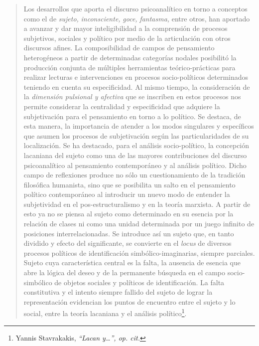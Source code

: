 \begin{quote}
Los desarrollos que aporta el discurso psicoanalítico en torno a conceptos como el de \emph{sujeto,} \emph{inconsciente,} \emph{goce,} \emph{fantasma,} entre otros, han aportado a avanzar y dar mayor inteligibilidad a la comprensión de procesos subjetivos, sociales y político por medio de la articulación con otros discursos afines. La composibilidad de campos de pensamiento heterogéneos a partir de determinadas categorías nodales posibilitó la producción conjunta de múltiples herramientas teórico-prácticas para realizar lecturas e intervenciones en procesos socio-políticos determinados teniendo en cuenta su especificidad. Al mismo tiempo, la consideración de la \emph{dimensión pulsional y afectiva} que se inscriben en estos procesos nos permite considerar la centralidad y especificidad que adquiere la subjetivación para el pensamiento en torno a lo político. Se destaca, de esta manera, la importancia de atender a los modos singulares y específicos que asumen los procesos de subjetivación  según las particularidades de su localización. Se ha destacado, para el análisis socio-político, la concepción lacaniana del sujeto como una de las mayores contribuciones del discurso psicoanalítico al pensamiento contemporáneo y al análisis político. Dicho campo de reflexiones produce no sólo un cuestionamiento de la tradición filosófica humanista, sino que se posibilita un salto en el pensamiento político contemporáneo al introducir un nuevo modo de entender la subjetividad en el pos-estructuralismo y en la teoría marxista. A partir de esto ya no se piensa al sujeto como determinado en su esencia por la relación de clases ni como una unidad determinada por un juego infinito de posiciones interrelacionadas. Se introduce así un sujeto que, en tanto dividido y efecto del significante, se convierte en el \emph{locus} de diversos procesos políticos de identificación simbólico-imaginarias, siempre parciales. Sujeto cuya característica central es la falta, la ausencia de esencia que abre la lógica del deseo y de la permanente búsqueda en el campo socio-simbólico de objetos sociales y políticos de identificación. La falta constitutiva y el intento siempre fallido del sujeto de lograr la representación evidencian los puntos de encuentro entre el sujeto y lo social, entre la teoría lacaniana y el análisis político\footnote{Yannis Stavrakakis, \emph{\enquote{Lacan y\ldots}, op. cit.}}.


\end{quote}
